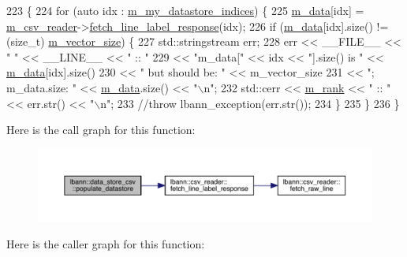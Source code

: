 \begin{DoxyCode}
223                                         \{
224   \textcolor{keywordflow}{for} (\textcolor{keyword}{auto} idx : \hyperlink{classlbann_1_1generic__data__store_abd38f8d8aab0648959e09d011abfe20a}{m\_my\_datastore\_indices}) \{
225     \hyperlink{classlbann_1_1data__store__csv_a8f0ac398b2ed53c36594ca1baaf4bde0}{m\_data}[idx] = \hyperlink{classlbann_1_1data__store__csv_a8920e09beb3e40e59e2858daf95a6cf9}{m\_csv\_reader}->\hyperlink{classlbann_1_1csv__reader_ae00ba61c2b9db1595ff62ab61a218cfb}{fetch\_line\_label\_response}(idx);
226     \textcolor{keywordflow}{if} (\hyperlink{classlbann_1_1data__store__csv_a8f0ac398b2ed53c36594ca1baaf4bde0}{m\_data}[idx].size() != (\textcolor{keywordtype}{size\_t}) \hyperlink{classlbann_1_1data__store__csv_acf75e96923877e10c8ed499ec48f9320}{m\_vector\_size}) \{
227       std::stringstream err;
228       err << \_\_FILE\_\_ << \textcolor{stringliteral}{" "} << \_\_LINE\_\_ << \textcolor{stringliteral}{" :: "}
229           << \textcolor{stringliteral}{"m\_data["} << idx << \textcolor{stringliteral}{"].size() is "} << \hyperlink{classlbann_1_1data__store__csv_a8f0ac398b2ed53c36594ca1baaf4bde0}{m\_data}[idx].size()
230           << \textcolor{stringliteral}{" but should be: "} << m\_vector\_size
231           << \textcolor{stringliteral}{"; m\_data.size: "} << \hyperlink{classlbann_1_1data__store__csv_a8f0ac398b2ed53c36594ca1baaf4bde0}{m\_data}.size() << \textcolor{stringliteral}{"\(\backslash\)n"};
232       std::cerr << \hyperlink{classlbann_1_1generic__data__store_a87695bfd2d1ed0dbe01d99108e3f68b7}{m\_rank} << \textcolor{stringliteral}{" :: "} << err.str() << \textcolor{stringliteral}{"\(\backslash\)n"};
233       \textcolor{comment}{//throw lbann\_exception(err.str());}
234     \}
235   \}
236 \}
\end{DoxyCode}
Here is the call graph for this function\+:\nopagebreak
\begin{figure}[H]
\begin{center}
\leavevmode
\includegraphics[width=350pt]{classlbann_1_1data__store__csv_a6184c48ec096372899e127235bb741da_cgraph}
\end{center}
\end{figure}
Here is the caller graph for this function\+:\nopagebreak
